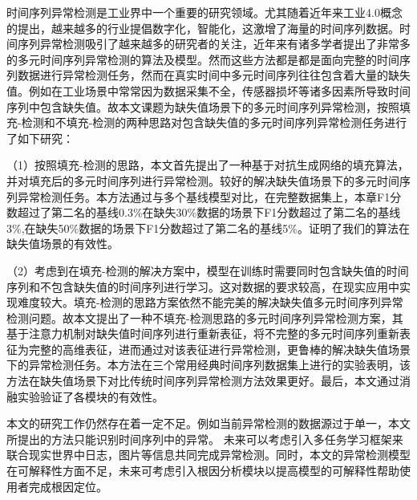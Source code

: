 
\begin{conclusions}

    
    时间序列异常检测是工业界中一个重要的研究领域。尤其随着近年来工业4.0概念的提出，越来越多的行业提倡数字化，智能化，这激增了海量的时间序列数据。时间序列异常检测吸引了越来越多的研究者的关注，近年来有诸多学者提出了非常多的多元时间序列异常检测的算法及模型。然而这些方法都是都是面向完整的时间序列数据进行异常检测任务，然而在真实时间中多元时间序列往往包含着大量的缺失值。例如在工业场景中常常因为数据采集不全，传感器损坏等诸多因素所导致时间序列中包含缺失值。故本文课题为缺失值场景下的多元时间序列异常检测，按照填充-检测和不填充-检测的两种思路对包含缺失值的多元时间序列异常检测任务进行了如下研究：
    
    （1）按照填充-检测的思路，本文首先提出了一种基于对抗生成网络的填充算法，并对填充后的多元时间序列进行异常检测。较好的解决缺失值场景下的多元时间序列异常检测任务。本方法通过与多个基线模型对比，在完整数据集上，本章F1分数超过了第二名的基线0.3\%在缺失30\%数据的场景下F1分数超过了第二名的基线3\%,在缺失50\%数据的场景下F1分数超过了第二名的基线5\%。证明了我们的算法在缺失值场景的有效性。
    
    （2）考虑到在填充-检测的解决方案中，模型在训练时需要同时包含缺失值的时间序列和不包含缺失值的时间序列进行学习。这对数据的要求较高，在现实应用中实现难度较大。填充-检测的思路方案依然不能完美的解决缺失值多元时间序列异常检测问题。故本文提出了一种不填充-检测思路的多元时间序列异常检测方案，其基于注意力机制对缺失值时间序列进行重新表征，将不完整的多元时间序列重新表征为完整的高维表征，进而通过对该表征进行异常检测，更鲁棒的解决缺失值场景下的异常检测任务。本方法在三个常用经典时间序列数据集上进行的实验表明，该方法在缺失值场景下对比传统时间序列异常检测方法效果更好。最后，本文通过消融实验验证了各模块的有效性。
    
    本文的研究工作仍然存在着一定不足。例如当前异常检测的数据源过于单一，本文所提出的方法只能识别时间序列中的异常。 未来可以考虑引入多任务学习框架来联合现实世界中日志，图片等信息共同完成异常检测。同时，本文的异常检测模型在可解释性方面不足，未来可考虑引入根因分析模块以提高模型的可解释性帮助使用者完成根因定位。
    
    \end{conclusions}
    